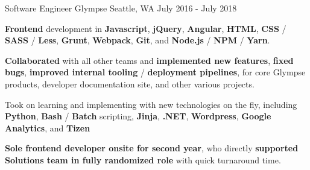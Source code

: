 \begin{cventries}
\cventry
{Software Engineer} %
{Glympse} %
{Seattle, WA} %
{July 2016 - July 2018} %
{
\begin{cvitems}
\item {\textbf{Frontend} development in \textbf{Javascript}, \textbf{jQuery}, \textbf{Angular}, \textbf{HTML}, \textbf{CSS} / \textbf{SASS} / \textbf{Less}, \textbf{Grunt}, \textbf{Webpack}, \textbf{Git}, and \textbf{Node.js} / \textbf{NPM} / \textbf{Yarn}.}
\item {\textbf{Collaborated} with all other teams and \textbf{implemented new features}, \textbf{fixed bugs}, \textbf{improved internal tooling} / \textbf{deployment pipelines}, for core Glympse products, developer documentation site, and other various projects.}
\item {Took on learning and implementing with new technologies on the fly, including \textbf{Python}, \textbf{Bash} / \textbf{Batch} scripting, \textbf{Jinja}, \textbf{.NET}, \textbf{Wordpress}, \textbf{Google Analytics}, and \textbf{Tizen}}
\item {\textbf{Sole frontend developer onsite for second year}, who directly \textbf{supported Solutions team in fully randomized role} with quick turnaround time.}
\end{cvitems}
}


\end{cventries}
